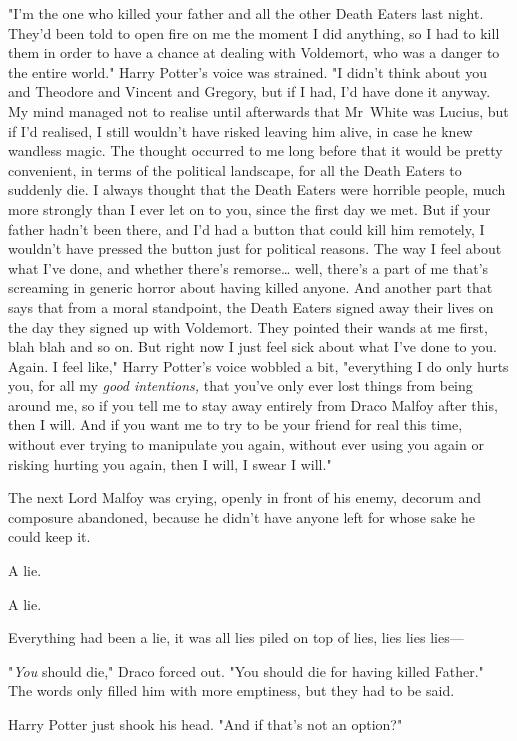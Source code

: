 "I'm the one who killed your father and all the other Death Eaters last night.
They'd been told to open fire on me the moment I did anything, so I had to kill
them in order to have a chance at dealing with Voldemort, who was a danger to
the entire world." Harry Potter's voice was strained. "I didn't think about you
and Theodore and Vincent and Gregory, but if I had, I'd have done it anyway. My
mind managed not to realise until afterwards that Mr~White was Lucius, but if
I'd realised, I still wouldn't have risked leaving him alive, in case he knew
wandless magic. The thought occurred to me long before that it would be pretty
convenient, in terms of the political landscape, for all the Death Eaters to
suddenly die. I always thought that the Death Eaters were horrible people, much
more strongly than I ever let on to you, since the first day we met. But if
your father hadn't been there, and I'd had a button that could kill him
remotely, I wouldn't have pressed the button just for political reasons. The
way I feel about what I've done, and whether there's remorse{\ldots} well,
there's a part of me that's screaming in generic horror about having killed
anyone. And another part that says that from a moral standpoint, the Death
Eaters signed away their lives on the day they signed up with Voldemort. They
pointed their wands at me first, blah blah and so on. But right now I just feel
sick about what I've done to you. Again. I feel like," Harry Potter's voice
wobbled a bit, "everything I do only hurts you, for all my \emph{good
intentions,} that you've only ever lost things from being around me, so if you
tell me to stay away entirely from Draco Malfoy after this, then I will. And if
you want me to try to be your friend for real this time, without ever trying to
manipulate you again, without ever using you again or risking hurting you
again, then I will, I swear I will."

The next Lord Malfoy was crying, openly in front of his enemy, decorum and
composure abandoned, because he didn't have anyone left for whose sake he could
keep it.

A lie.

A lie.

Everything had been a lie, it was all lies piled on top of lies, lies lies
lies---

"\emph{You} should die," Draco forced out. "You should die for having killed
Father." The words only filled him with more emptiness, but they had to be said.

Harry Potter just shook his head. "And if that's not an option?"

